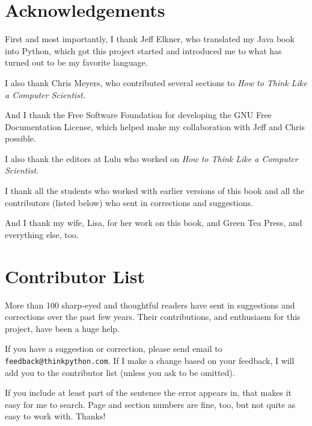 \documentclass[10pt]{book}
\begin{document}



\section*{Acknowledgements}

First and most importantly, I thank Jeff Elkner, who
translated my Java book into Python, which got this project
started and introduced me to what has turned out to be my
favorite language.

I also thank Chris Meyers, who contributed several sections
to {\em How to Think Like a Computer Scientist}.

And I thank the Free Software Foundation for developing
the GNU Free Documentation License, which helped make
my collaboration with Jeff and Chris possible.


I also thank the editors at Lulu who worked on
{\em How to Think Like a Computer Scientist}.

I thank all the students who worked with earlier
versions of this book and all the contributors (listed
below) who sent in corrections and suggestions.

And I thank my wife, Lisa, for her work on this book, and Green
Tea Press, and everything else, too.


\section*{Contributor List}


More than 100 sharp-eyed and thoughtful readers have sent in
suggestions and corrections over the past few years.  Their
contributions, and enthusiasm for this project, have been a
huge help.

If you have a suggestion or correction, please send email to 
{\tt feedback@thinkpython.com}.  If I make a change based on your
feedback, I will add you to the contributor list
(unless you ask to be omitted).

If you include at least part of the sentence the
error appears in, that makes it easy for me to search.  Page and
section numbers are fine, too, but not quite as easy to work with.
Thanks!
\end{document}
